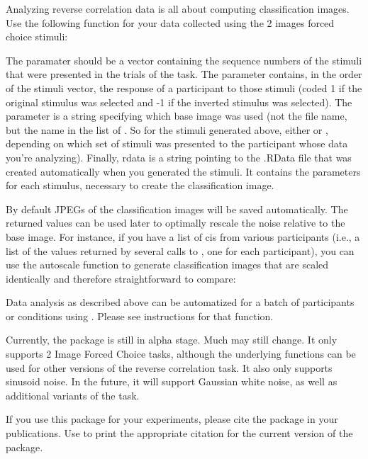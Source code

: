 \documentclass[letterpaper]{book}
\begin{document}
\begin{Details}

Analyzing reverse correlation data is all about computing classification images. Use the following function for your data collected using the 2 images forced choice stimuli:


The  paramater should be a vector containing the sequence numbers of the stimuli that were presented in the trials of the task. The  parameter contains, in the order of the stimuli vector, the response of a participant to those stimuli (coded 1 if the original stimulus was selected and -1 if the inverted stimulus was selected). The  parameter is a string specifying which base image was used (not the file name, but the name in the list of . So for the stimuli generated above, either  or , depending on which set of stimuli was presented to the participant whose data you're analyzing). Finally, rdata is a string pointing to the .RData file that was created automatically when you generated the stimuli. It contains the parameters for each stimulus, necessary to create the classification image.

By default JPEGs of the classification images will be saved automatically. The returned values can be used later to optimally rescale the noise relative to the base image. For instance, if you have a list of cis from various participants (i.e., a list of the values returned by several calls to , one for each participant), you can use the autoscale function to generate classification images that are scaled identically and therefore straightforward to compare:



Data analysis as described above can be automatized for a batch of participants or conditions using . Please see instructions for that function.


Currently, the package is still in alpha stage. Much may still change. It only supports 2 Image Forced Choice tasks, although the underlying functions can be used for other versions of the reverse correlation task. It also only supports sinusoid noise. In the future, it will support Gaussian white noise, as well as additional variants of the task.

If you use this package for your experiments, please cite the package in your publications. Use  to print the appropriate citation for the current version of the package.
\end{Details}
\end{document}
